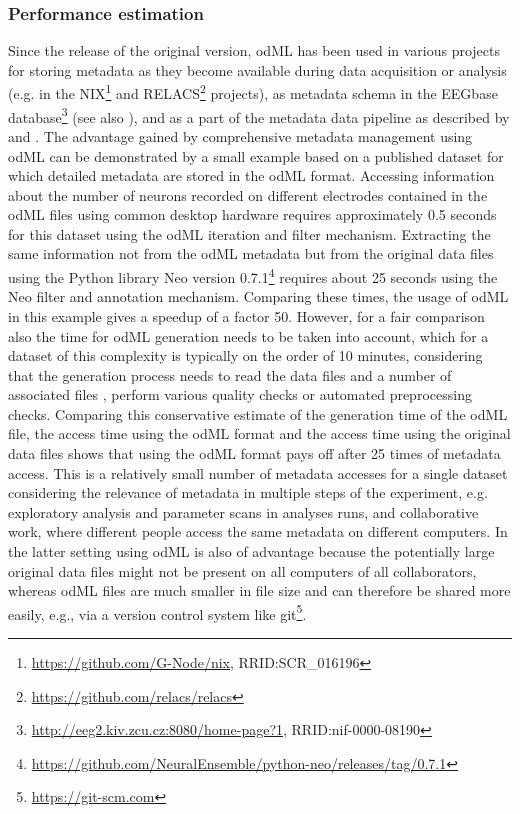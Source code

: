 {\subsubsection{Performance estimation}
Since the release of the original version, odML has been used in various projects for storing metadata as they become available during data acquisition or analysis (e.g. in the NIX\footnote{\url{https://github.com/G-Node/nix}, RRID:SCR\_016196} and RELACS\footnote{\url{https://github.com/relacs/relacs}} projects), as metadata schema in the EEGbase database\footnote{\url{http://eeg2.kiv.zcu.cz:8080/home-page?1}, RRID:nif-0000-08190} (see also \citealp{Moucek_2014}), and as a part of the metadata data pipeline as described by \cite{Zehl_2016} and \cite{Brochier_2018}. The advantage gained by comprehensive metadata management using odML can be demonstrated by a small example based on a published dataset \citep{Brochier_2018} for which detailed metadata are stored in the odML format. Accessing information about the number of neurons recorded on different electrodes contained in the odML files using common desktop hardware requires approximately 0.5 seconds for this dataset using the odML iteration and filter mechanism. Extracting the same information not from the odML metadata but from the original data files using the Python library Neo version 0.7.1\footnote{\url{https://github.com/NeuralEnsemble/python-neo/releases/tag/0.7.1}} requires about 25 seconds using the Neo filter and annotation mechanism. Comparing these times, the usage of odML in this example gives a speedup of a factor 50. However, for a fair comparison also the time for odML generation needs to be taken into account, which for a dataset of this complexity is typically on the order of 10 minutes, considering that the generation process needs to read the data files and a number of associated files \citep{Zehl_2016}, perform various quality checks or automated preprocessing checks. Comparing this conservative estimate of the generation time of the odML file, the access time using the odML format and the access time using the original data files shows that using the odML format pays off after 25 times of metadata access. This is a relatively small number of metadata accesses for a single dataset considering the relevance of metadata in multiple steps of the experiment, e.g. exploratory analysis and parameter scans in analyses runs, and collaborative work, where different people access the same metadata on different computers. In the latter setting using odML is also of advantage because the potentially large original data files might not be present on all computers of all collaborators, whereas odML files are much smaller in file size and can therefore be shared more easily, e.g., via a version control system like git\footnote{\url{https://git-scm.com}}.

}
